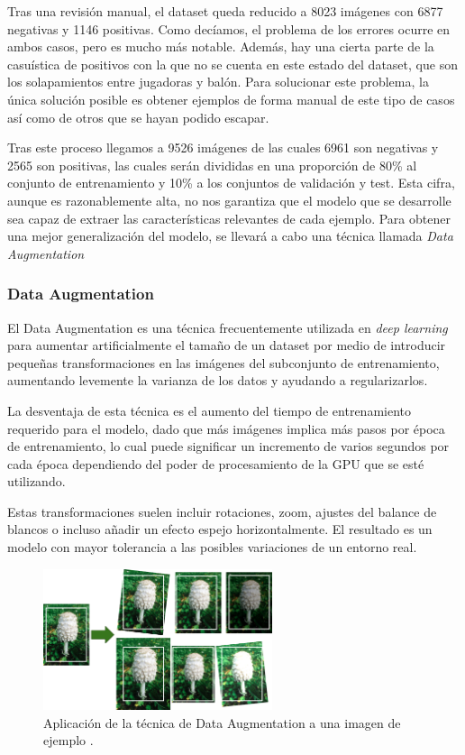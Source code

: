 Tras una revisión manual, el dataset queda reducido a 8023 imágenes con 6877 negativas y 1146 positivas. Como decíamos, el problema de los errores ocurre en ambos casos, pero es mucho más notable. Además, hay una cierta parte de la casuística de positivos con la que no se cuenta en este estado del dataset, que son los solapamientos entre jugadoras y balón. Para solucionar este problema, la única solución posible es obtener ejemplos de forma manual de este tipo de casos así como de otros que se hayan podido escapar.

Tras este proceso llegamos a 9526 imágenes de las cuales 6961 son negativas y 2565 son positivas, las cuales serán divididas en una proporción de 80\% al conjunto de entrenamiento y 10\% a los conjuntos de validación y test. Esta cifra, aunque es razonablemente alta, no nos garantiza que el modelo que se desarrolle sea capaz de extraer las características relevantes de cada ejemplo. Para obtener una mejor generalización del modelo, se llevará a cabo una técnica llamada \textit{Data Augmentation}

\subsubsection*{Data Augmentation}

El Data Augmentation es una técnica frecuentemente utilizada en \textit{deep learning} para aumentar artificialmente el tamaño de un dataset por medio de introducir pequeñas transformaciones en las imágenes del subconjunto de entrenamiento, aumentando levemente la varianza de los datos y ayudando a regularizarlos.

La desventaja de esta técnica es el aumento del tiempo de entrenamiento requerido para el modelo, dado que más imágenes implica más pasos por época de entrenamiento, lo cual puede significar un incremento de varios segundos por cada época dependiendo del poder de procesamiento de la GPU que se esté utilizando.

Estas transformaciones suelen incluir rotaciones, zoom, ajustes del balance de blancos o incluso añadir un efecto espejo horizontalmente. El resultado es un modelo con mayor tolerancia a las posibles variaciones de un entorno real.

\begin{figure}[H]
	\centering
  \includegraphics[width=0.6\textwidth]{images/dataAug}
	\caption{Aplicación de la técnica de Data Augmentation a una imagen de ejemplo \cite{book:homl}.}
  \label{fig:dataAug}
\end{figure}


